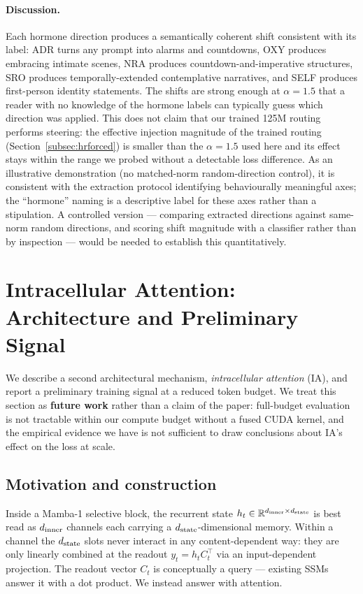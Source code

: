 \paragraph{Discussion.} Each hormone direction produces a semantically coherent shift consistent with its label: ADR turns any prompt into alarms and countdowns, OXY produces embracing intimate scenes, NRA produces countdown-and-imperative structures, SRO produces temporally-extended contemplative narratives, and SELF produces first-person identity statements. The shifts are strong enough at $\alpha = 1.5$ that a reader with no knowledge of the hormone labels can typically guess which direction was applied. This does not claim that our trained 125M routing performs steering: the effective injection magnitude of the trained routing (Section~\ref{subsec:hrforced}) is smaller than the $\alpha = 1.5$ used here and its effect stays within the range we probed without a detectable loss difference. As an illustrative demonstration (no matched-norm random-direction control), it is consistent with the extraction protocol identifying behaviourally meaningful axes; the ``hormone'' naming is a descriptive label for these axes rather than a stipulation. A controlled version --- comparing extracted directions against same-norm random directions, and scoring shift magnitude with a classifier rather than by inspection --- would be needed to establish this quantitatively.


\section{Intracellular Attention: Architecture and Preliminary Signal}
\label{app:ia}

We describe a second architectural mechanism, \emph{intracellular attention} (IA), and report a preliminary training signal at a reduced token budget. We treat this section as \textbf{future work} rather than a claim of the paper: full-budget evaluation is not tractable within our compute budget without a fused CUDA kernel, and the empirical evidence we have is not sufficient to draw conclusions about IA's effect on the loss at scale.

\subsection{Motivation and construction}

Inside a Mamba-1 selective block, the recurrent state $h_t \in \mathbb{R}^{d_{\text{inner}} \times d_{\text{state}}}$ is best read as $d_{\text{inner}}$ channels each carrying a $d_{\text{state}}$-dimensional memory. Within a channel the $d_{\text{state}}$ slots never interact in any content-dependent way: they are only linearly combined at the readout $y_t = h_t C_t^\top$ via an input-dependent projection. The readout vector $C_t$ is conceptually a query --- existing SSMs answer it with a dot product. We instead answer with attention.

